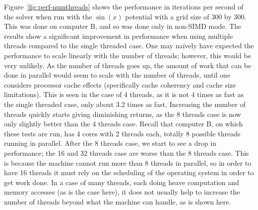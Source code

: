 











Figure~\ref{fig:perf-numthreads} shows the performance in iterations per second of the solver when run
with the $\sin(x)$ potential with a grid size of 300 by 300. This was done on computer B, and so was done
only in non-SIMD mode. The results show a significant improvement in performance when using multiple threads
compared to the single threaded case. One may na\"{i}vely have expected the performance to scale linearly
with the number of threads; however, this would be very unlikely. As the number of threads goes up, the amount
of work that can be done in parallel would seem to scale with the number of threads, until one considers processor cache effects (specifically
cache coherency and cache size limitations). This is seen in the case of 4 threads, as it is not 4 times as fast as
the single threaded case, only about 3.2 times as fast. Increasing the number of threads quickly starts giving diminishing
returns, as the 8 threads case is now only slightly better than the 4 threads case. Recall that computer B, on which these
tests are run, has 4 cores with 2 threads each, totally 8 possible threads running in parallel. After the 8 threads case,
we start to see a drop in performance; the 16 and 32 threads case are worse than the 8 threads case. This is because
the machine cannot run more than 8 threads in parallel, so in order to have 16 threads it must rely on the scheduling
of the operating system in order to get work done. In a case of many threads, each doing heave computation and memory accesses
(as is the case here), it does not usually help to increase the number of threads beyond what the machine can handle,
as is shown here.


